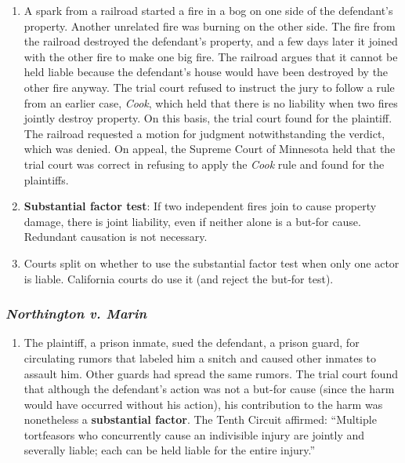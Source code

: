 \begin{enumerate}
    \item A spark from a railroad started a fire in a bog on one side of the 
    defendant's property. Another unrelated fire was burning on the other 
    side. The fire from the railroad destroyed the defendant's property, and a 
    few days later it joined with the other fire to make one big fire. The 
    railroad argues that it cannot be held liable because the defendant's 
    house would have been destroyed by the other fire anyway. The trial court 
    refused to instruct the jury to follow a rule from an earlier case, 
    \emph{Cook}, which held that there is no liability when two fires jointly 
    destroy property. On this basis, the trial court found for the plaintiff. 
    The railroad requested a motion for judgment notwithstanding the verdict, 
    which was denied. On appeal, the Supreme Court of Minnesota held that the 
    trial court was correct in refusing to apply the \emph{Cook} rule and 
    found for the plaintiffs.
    \item \textbf{Substantial factor test}: If two independent fires join to 
    cause property damage, there is joint liability, even if neither alone is 
    a but-for cause. Redundant causation is not necessary.
    \item Courts split on whether to use the substantial factor test when only 
    one actor is liable. California courts do use it (and reject the but-for 
    test).
\end{enumerate}

\subsubsection{\emph{Northington v. Marin}}

\begin{enumerate}
    \item The plaintiff, a prison inmate, sued the defendant, a prison guard, 
    for circulating rumors that labeled him a snitch and caused other inmates 
    to assault him. Other guards had spread the same rumors. The trial court 
    found that although the defendant's action was not a but-for cause (since 
    the harm would have occurred without his action), his contribution to the 
    harm was nonetheless a \textbf{substantial factor}. The Tenth Circuit 
    affirmed: ``Multiple tortfeasors who concurrently cause an indivisible 
    injury are jointly and severally liable; each can be held liable for the 
    entire injury.''
\end{enumerate}

